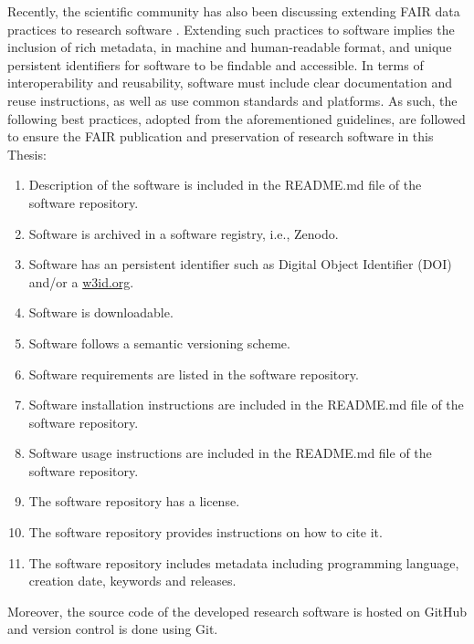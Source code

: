 Recently, the scientific community has also been discussing extending FAIR data practices to research software  \citep{martinez_top_2019,gruenpeter_d44_2024}.
Extending such practices to software implies the inclusion of rich metadata, in machine and human-readable format, and unique persistent identifiers for software to be findable and accessible.
In terms of interoperability and reusability, software must include clear documentation and reuse instructions, as well as use common standards and platforms.
As such, the following best practices, adopted from the aforementioned guidelines, are followed to ensure the FAIR publication and preservation of research software in this Thesis:

\begin{enumerate}
    \item Description of the software is included in the README.md file of the software repository. 
    \item Software is archived in a software registry, i.e., Zenodo.
    \item Software has an persistent identifier such as Digital Object Identifier (DOI) and/or a \url{w3id.org}.
    \item Software is downloadable.
    \item Software follows a semantic versioning scheme.
    \item Software requirements are listed in the software repository.
    \item Software installation instructions are included in the README.md file of the software repository.
    \item Software usage instructions are included in the README.md file of the software repository.
    \item The software repository has a license.
    \item The software repository provides instructions on how to cite it.
    \item The software repository includes metadata including programming language, creation date, keywords and releases.
\end{enumerate}

Moreover, the source code of the developed research software is hosted on GitHub and version control is done using Git.